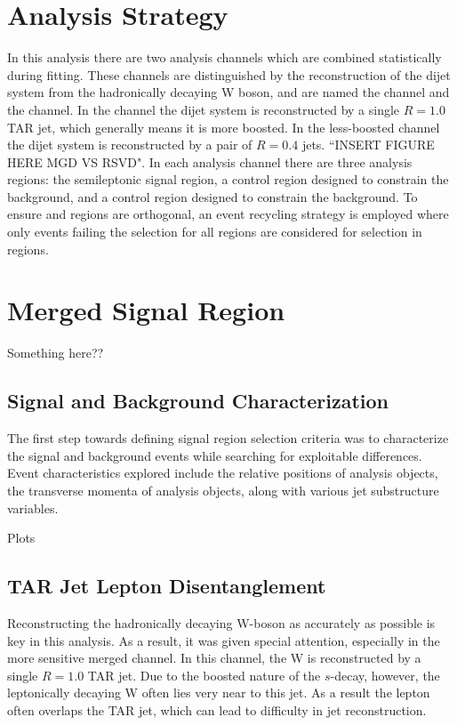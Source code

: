 \section{Analysis Strategy}
\label{section:ana_strat}
In this analysis there are two analysis channels which are combined statistically during fitting. These channels are distinguished by the reconstruction of the dijet system from the hadronically decaying W boson, and are named the \merged channel and the \resolved channel. In the \merged channel the dijet system is reconstructed by a single $R=1.0$ TAR jet, which generally means it is more boosted. In the less-boosted \resolved channel the dijet system is reconstructed by a pair of $R=0.4$ jets. ``INSERT FIGURE HERE MGD VS RSVD". In each analysis channel there are three analysis regions: the semileptonic signal region, a control region designed to constrain the \ttbar background, and a control region designed to constrain the \wjets background. To ensure \merged and \resolved regions are orthogonal, an event recycling strategy is employed where only events failing the selection for all \merged regions are considered for selection in \resolved regions.

\section{Merged Signal Region}
Something here??
\label{section:sr_merged}
\subsection{Signal and Background Characterization}
The first step towards defining signal region selection criteria was to characterize the signal and background events while searching for exploitable differences. Event characteristics explored include the relative positions of analysis objects, the transverse momenta of analysis objects, along with various jet substructure variables.

Plots

\subsection{TAR Jet Lepton Disentanglement}
Reconstructing the hadronically decaying W-boson as accurately as possible is key in this analysis. As a result, it was given special attention, especially in the more sensitive merged channel. In this channel, the W is reconstructed by a single $R=1.0$ TAR jet. Due to the boosted nature of the $s$-decay, however, the leptonically decaying W often lies very near to this jet. As a result the lepton often overlaps the TAR jet, which can lead to difficulty in jet reconstruction.

